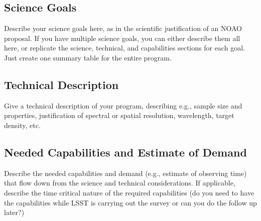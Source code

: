 \subsection{Science Goals}

Describe your science goals here, as in the scientific justification of an NOAO proposal. If you have multiple science goals, you can either describe them all here, or replicate the science, technical, and capabilities sections for each goal.  Just create one summary table for the entire program.  

\subsection{Technical Description }

Give a technical description of your program, describing e.g., sample size and properties, justification of spectral or spatial resolution, wavelength, target density, etc.

\subsection{Needed Capabilities and Estimate of Demand}

Describe the needed capabilities and demand (e.g., estimate of observing time) that flow down from the science and technical considerations. If applicable, describe the time critical nature of the required capabilities (do you need to have the capabilities while LSST is carrying out the survey or can you do the follow up later?) 


